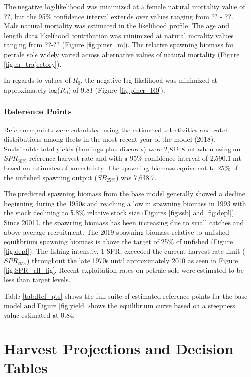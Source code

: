 \documentclass[12pt,]{article}
\begin{document}
The negative log-likelihood was minimized at a female natural mortality
value of ??, but the 95\% confidence interval extends over values
ranging from ?? - ??. Male natural mortality was estimated in the
likelihood profile. The age and length data likelihood contribution was
minimized at natural morality values ranging from ??-?? (Figure
\ref{fig:piner_m}). The relative spawning biomass for petrale sole
widely varied across alternative values of natural mortality (Figure
\ref{fig:m_trajectory}).

In regards to values of \(R_0\), the negative log-likelihood was
minimized at approximately log(\(R_0\)) of 9.83 (Figure
\ref{fig:piner_R0}).

\subsubsection{Reference Points}\label{reference-points-1}

Reference points were calculated using the estimated selectivities and
catch distributions among fleets in the most recent year of the model
(2018). Sustainable total yields (landings plus discards) were 2,819.8
mt when using an \(SPR_{30\%}\) reference harvest rate and with a 95\%
confidence interval of 2,590.1 mt based on estimates of uncertainty. The
spawning biomass equivalent to 25\% of the unfished spawning output
(\(SB_{25\%}\)) was 7,638.7.

The predicted spawning biomass from the base model generally showed a
decline beginning during the 1950s and reaching a low in spawning
biomass in 1993 with the stock declining to 5.8\% relative stock size
(Figures \ref{fig:ssb} and \ref{fig:depl}). Since 20010, the spawning
biomass has been increasing due to small catches and above average
recruitment. The 2019 spawning biomass relative to unfished equilibrium
spawning biomass is above the target of 25\% of unfished (Figure
\ref{fig:depl}). The fishing intensity, 1-SPR, exceeded the current
harvest rate limit (\(SPR_{30\%}\)) throughout the late 1970s until
approximately 2010 as seen in Figure \ref{fig:SPR_all_fig}. Recent
exploitation rates on petrale sole were estimated to be less than target
levels.

Table \ref{tab:Ref_pts} shows the full suite of estimated reference
points for the base model and Figure \ref{fig:yield} shows the
equilibrium curve based on a steepness value estimated at 0.84.

\section{Harvest Projections and Decision
Tables}\label{harvest-projections-and-decision-tables}
\end{document}
